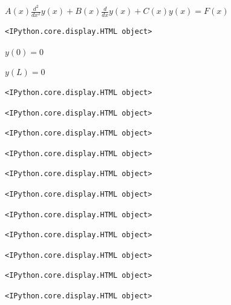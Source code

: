 \documentclass[
  11pt,
  a4paper,
]{scrbook}
\begin{document}
$\displaystyle A{\left(x \right)} \frac{d^{2}}{d x^{2}} y{\left(x \right)} + B{\left(x \right)} \frac{d}{d x} y{\left(x \right)} + C{\left(x \right)} y{\left(x \right)} = F{\left(x \right)}$

\begin{verbatim}
<IPython.core.display.HTML object>
\end{verbatim}

$\displaystyle y{\left(0 \right)} = 0$

$\displaystyle y{\left(L \right)} = 0$

\begin{verbatim}
<IPython.core.display.HTML object>
\end{verbatim}

\begin{verbatim}
<IPython.core.display.HTML object>
\end{verbatim}

\begin{verbatim}
<IPython.core.display.HTML object>
\end{verbatim}

\begin{verbatim}
<IPython.core.display.HTML object>
\end{verbatim}

\begin{verbatim}
<IPython.core.display.HTML object>
\end{verbatim}

\begin{verbatim}
<IPython.core.display.HTML object>
\end{verbatim}

\begin{verbatim}
<IPython.core.display.HTML object>
\end{verbatim}

\begin{verbatim}
<IPython.core.display.HTML object>
\end{verbatim}

\begin{verbatim}
<IPython.core.display.HTML object>
\end{verbatim}

\begin{verbatim}
<IPython.core.display.HTML object>
\end{verbatim}

\begin{verbatim}
<IPython.core.display.HTML object>
\end{verbatim}
\end{document}
